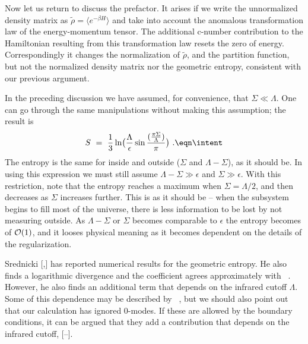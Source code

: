 Now let us return to discuss the prefactor.  It arises if we
write the unnormalized density matrix as
$\tilde \rho = \langle e^{-\beta H} \rangle$
and take into account the anomalous transformation law of the
energy-momentum tensor.  The additional c-number contribution to the
Hamiltonian resulting from this transformation law resets the zero of
energy.  Correspondingly it changes the normalization of $\tilde \rho$,
and the partition function, but not the normalized density matrix nor
the geometric entropy, consistent with our previous argument.


In the preceding
discussion we have assumed, for convenience, that $\Sigma\ll
\Lambda$.  One can go through the same manipulations without making this
assumption; the result is
$$
S~=~{1\over 3}\ln \bigl({\Lambda \over \epsilon}
\sin {({\pi\Sigma \over \Lambda}) \over \pi} \bigr)~.
\eqn\intent
$$
The entropy is the same
for inside and outside ($\Sigma$ and
$\Lambda - \Sigma$), as it should be.
In using this expression we must still assume $\Lambda - \Sigma \gg
\epsilon$ and $\Sigma \gg \epsilon$.  With this restriction, note
that the entropy reaches a maximum when
$\Sigma = \Lambda/2$, and then decreases as $\Sigma$ increases
further.  This is as it should be -- when the subsystem begins to fill
most of the universe, there is less information to be lost by not
measuring outside.
As $\Lambda-\Sigma$ or $\Sigma$ becomes comparable to $\epsilon$ the
entropy becomes of ${\cal O} ( 1 )$, and it looses physical meaning as
it becomes dependent on the details of the regularization.

Srednicki [\srednickione ,\srednickitwo ]
has reported numerical results for the geometric entropy.
He also finds a logarithmic divergence and the coefficient agrees
approximately with \zaza\ . However, he also finds an additional term
that depends on the infrared cutoff $\Lambda $. Some of this dependence
may be described by \intent\ , but we should also point out
that our calculation has ignored 0-modes.
If these are allowed by the boundary conditions,
it can be argued that they add a contribution that depends on the
infrared cutoff, [\srednickitwo --\keski ].

